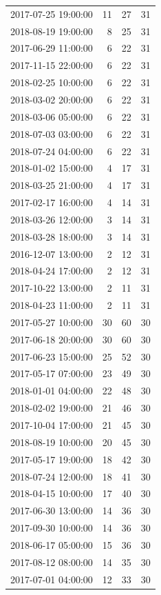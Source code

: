 \begin{tabular}{lrrr}
2017-07-25 19:00:00 & 11 & 27 & 31 \\
2018-08-19 19:00:00 & 8 & 25 & 31 \\
2017-06-29 11:00:00 & 6 & 22 & 31 \\
2017-11-15 22:00:00 & 6 & 22 & 31 \\
2018-02-25 10:00:00 & 6 & 22 & 31 \\
2018-03-02 20:00:00 & 6 & 22 & 31 \\
2018-03-06 05:00:00 & 6 & 22 & 31 \\
2018-07-03 03:00:00 & 6 & 22 & 31 \\
2018-07-24 04:00:00 & 6 & 22 & 31 \\
2018-01-02 15:00:00 & 4 & 17 & 31 \\
2018-03-25 21:00:00 & 4 & 17 & 31 \\
2017-02-17 16:00:00 & 4 & 14 & 31 \\
2018-03-26 12:00:00 & 3 & 14 & 31 \\
2018-03-28 18:00:00 & 3 & 14 & 31 \\
2016-12-07 13:00:00 & 2 & 12 & 31 \\
2018-04-24 17:00:00 & 2 & 12 & 31 \\
2017-10-22 13:00:00 & 2 & 11 & 31 \\
2018-04-23 11:00:00 & 2 & 11 & 31 \\
2017-05-27 10:00:00 & 30 & 60 & 30 \\
2017-06-18 20:00:00 & 30 & 60 & 30 \\
2017-06-23 15:00:00 & 25 & 52 & 30 \\
2017-05-17 07:00:00 & 23 & 49 & 30 \\
2018-01-01 04:00:00 & 22 & 48 & 30 \\
2018-02-02 19:00:00 & 21 & 46 & 30 \\
2017-10-04 17:00:00 & 21 & 45 & 30 \\
2018-08-19 10:00:00 & 20 & 45 & 30 \\
2017-05-17 19:00:00 & 18 & 42 & 30 \\
2018-07-24 12:00:00 & 18 & 41 & 30 \\
2018-04-15 10:00:00 & 17 & 40 & 30 \\
2017-06-30 13:00:00 & 14 & 36 & 30 \\
2017-09-30 10:00:00 & 14 & 36 & 30 \\
2018-06-17 05:00:00 & 15 & 36 & 30 \\
2017-08-12 08:00:00 & 14 & 35 & 30 \\
2017-07-01 04:00:00 & 12 & 33 & 30 \\

\end{tabular}
